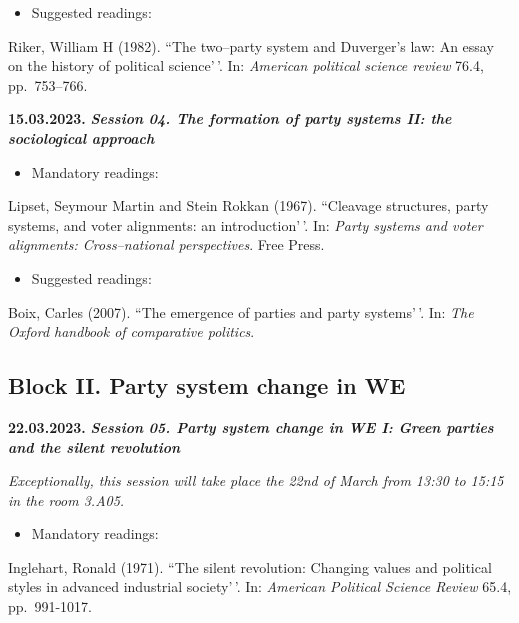 \documentclass[
  12pt,
]{article}
\providecommand{\tightlist}{%
  \setlength{\itemsep}{0pt}\setlength{\parskip}{0pt}}
\begin{document}
\begin{itemize}
\tightlist
\item
  Suggested readings:
\end{itemize}

Riker, William H (1982). ``The two--party system and Duverger's law: An
essay on the history of political science'\,'. In:
\emph{American political science review} 76.4, pp.~753--766.

\textbf{15.03.2023.} \textbf{\emph{Session 04. The formation of party
systems II: the sociological approach}}

\begin{itemize}
\tightlist
\item
  Mandatory readings:
\end{itemize}

Lipset, Seymour Martin and Stein Rokkan (1967). ``Cleavage structures,
party systems, and voter alignments: an introduction'\,'. In:
\emph{Party systems and voter alignments: Cross--national perspectives}.
Free Press.

\begin{itemize}
\tightlist
\item
  Suggested readings:
\end{itemize}

Boix, Carles (2007). ``The emergence of parties and party systems'\,'.
In: \emph{The Oxford handbook of comparative politics}.

\hypertarget{block-ii.-party-system-change-in-we}{%
\subsection{Block II. Party system change in
WE}\label{block-ii.-party-system-change-in-we}}

\textbf{22.03.2023.} \textbf{\emph{Session 05. Party system change in WE
I: Green parties and the silent revolution}}

\emph{Exceptionally, this session will take place the 22nd of March from
13:30 to 15:15 in the room 3.A05.}

\begin{itemize}
\tightlist
\item
  Mandatory readings:
\end{itemize}

Inglehart, Ronald (1971). ``The silent revolution: Changing values and
political styles in advanced industrial society'\,'. In:
\emph{American Political Science Review} 65.4, pp.~991-1017.
\end{document}
